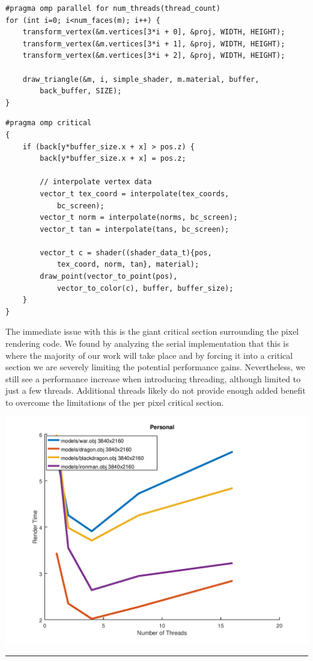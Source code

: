 \documentclass[12pt]{article}
\begin{document}
\begin{verbatim}
#pragma omp parallel for num_threads(thread_count)
for (int i=0; i<num_faces(m); i++) {
	transform_vertex(&m.vertices[3*i + 0], &proj, WIDTH, HEIGHT);
	transform_vertex(&m.vertices[3*i + 1], &proj, WIDTH, HEIGHT);
	transform_vertex(&m.vertices[3*i + 2], &proj, WIDTH, HEIGHT);

	draw_triangle(&m, i, simple_shader, m.material, buffer, 
		back_buffer, SIZE);
}
\end{verbatim}
\bigbreak
\begin{verbatim}
#pragma omp critical
{
	if (back[y*buffer_size.x + x] > pos.z) {
		back[y*buffer_size.x + x] = pos.z;

		// interpolate vertex data
		vector_t tex_coord = interpolate(tex_coords, 
			bc_screen);
		vector_t norm = interpolate(norms, bc_screen);
		vector_t tan = interpolate(tans, bc_screen);

		vector_t c = shader((shader_data_t){pos, 
			tex_coord, norm, tan}, material);
		draw_point(vector_to_point(pos), 
			vector_to_color(c), buffer, buffer_size);
	}
}
\end{verbatim}

The immediate issue with this is the giant critical section surrounding the pixel
rendering code. We found by analyzing the serial implementation that this is where the 
majority of our work will take place and by forcing it into a critical section we are
severely limiting the potential performance gains. Nevertheless, we still see a performance
increase when introducing threading, although limited to just a few threads. Additional threads
likely do not provide enough added benefit to overcome the limitations of the per pixel critical section.

\begin{center}
	\includegraphics[scale=0.5]{parallel0_personal.png}
\end{center}
\textcolor[RGB]{200,200,200}{\rule{\textwidth}{0.75pt}}\bigbreak
\end{document}
